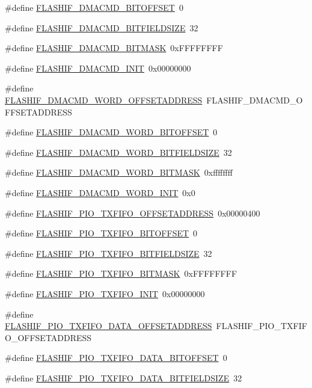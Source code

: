 \begin{DoxyCompactItemize}
\item 
\#define \hyperlink{a00552_aee461c63d8b6fd96370894a8c220798e}{FLASHIF\_\-DMACMD\_\-BITOFFSET}~0
\item 
\#define \hyperlink{a00552_a834dc4a84544e8292b7784eb5e728fa2}{FLASHIF\_\-DMACMD\_\-BITFIELDSIZE}~32
\item 
\#define \hyperlink{a00552_ac60a562c3ba0335789fee74e0b1c4974}{FLASHIF\_\-DMACMD\_\-BITMASK}~0xFFFFFFFF
\item 
\#define \hyperlink{a00552_ab9cbe2be32d879dfb6721def6ef02420}{FLASHIF\_\-DMACMD\_\-INIT}~0x00000000
\item 
\#define \hyperlink{a00552_ab67e4e012c3f3e4a62563f8ba8f55055}{FLASHIF\_\-DMACMD\_\-WORD\_\-OFFSETADDRESS}~FLASHIF\_\-DMACMD\_\-OFFSETADDRESS
\item 
\#define \hyperlink{a00552_aecb765c2020c1c0a0da02a7311624ac9}{FLASHIF\_\-DMACMD\_\-WORD\_\-BITOFFSET}~0
\item 
\#define \hyperlink{a00552_a2e1b2be841bfbed2fbcb8f63031f24df}{FLASHIF\_\-DMACMD\_\-WORD\_\-BITFIELDSIZE}~32
\item 
\#define \hyperlink{a00552_a18921768428b2419284b2412680411b5}{FLASHIF\_\-DMACMD\_\-WORD\_\-BITMASK}~0xffffffff
\item 
\#define \hyperlink{a00552_a63b44752a40d049678db361d368c3d9f}{FLASHIF\_\-DMACMD\_\-WORD\_\-INIT}~0x0
\item 
\#define \hyperlink{a00552_a781afd5a185bc7f5694cfed0a34bb01a}{FLASHIF\_\-PIO\_\-TXFIFO\_\-OFFSETADDRESS}~0x00000400
\item 
\#define \hyperlink{a00552_af5c3ed5a00c38691d88d3d72f935f32e}{FLASHIF\_\-PIO\_\-TXFIFO\_\-BITOFFSET}~0
\item 
\#define \hyperlink{a00552_af381607661e1c76f4ca7e2e505e1585c}{FLASHIF\_\-PIO\_\-TXFIFO\_\-BITFIELDSIZE}~32
\item 
\#define \hyperlink{a00552_a88c8db64ef95da9adc07962218b20c1d}{FLASHIF\_\-PIO\_\-TXFIFO\_\-BITMASK}~0xFFFFFFFF
\item 
\#define \hyperlink{a00552_a5de4bf497eb90af4c1892a306b9ef78f}{FLASHIF\_\-PIO\_\-TXFIFO\_\-INIT}~0x00000000
\item 
\#define \hyperlink{a00552_aa74628b15e4fdd23368884232cb1b0ba}{FLASHIF\_\-PIO\_\-TXFIFO\_\-DATA\_\-OFFSETADDRESS}~FLASHIF\_\-PIO\_\-TXFIFO\_\-OFFSETADDRESS
\item 
\#define \hyperlink{a00552_a9f3bb91f1e15aa3ca19fcc23965688dd}{FLASHIF\_\-PIO\_\-TXFIFO\_\-DATA\_\-BITOFFSET}~0
\item 
\#define \hyperlink{a00552_af45139d1ebf643a37f4f75ff14ebf0dd}{FLASHIF\_\-PIO\_\-TXFIFO\_\-DATA\_\-BITFIELDSIZE}~32

\end{DoxyCompactItemize}

